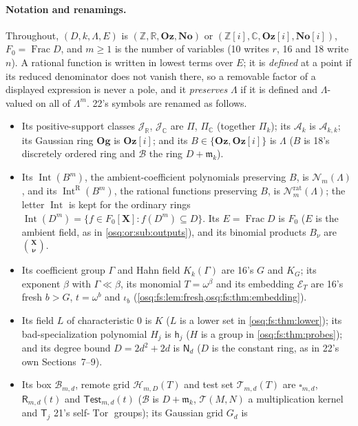 \documentclass[11pt,letterpaper]{article}
\numberwithin{equation}{section}
\theoremstyle{definition}
\theoremstyle{remark}
\theoremstyle{plain}
\newcommand{\No}{\mathbf{No}}
\newcommand{\Oz}{\mathbf{Oz}}
\newcommand{\SC}{\No[i]}
\newcommand{\GOz}{\Oz[i]}
\newcommand{\Z}{\mathbb Z}
\newcommand{\R}{\mathbb R}
\newcommand{\C}{\mathbb C}
\newcommand{\A}{\mathcal A}          %
\newcommand{\B}{\mathcal B}          %
\newcommand{\mm}{\mathfrak m}        %
\newcommand{\Frac}{\operatorname{Frac}}
\newcommand{\Tor}{\operatorname{Tor}}
\newcommand{\Int}{\operatorname{Int}}
\newcommand{\Num}{\mathscr N}
\begin{document}
\paragraph{Notation and renamings.} Throughout, $(D,k,\Lambda,E)$ is $(\Z,\R,\Oz,\No)$ or $(\Z[i],\C,\GOz,\SC)$, $F_0=\Frac D$, and $m\ge1$ is the
number of variables (10 writes $r$, 16 and 18 write $n$). A rational function is written in lowest terms over $E$; it is \emph{defined} at a point if its
reduced denominator does not vanish there, so a removable factor of a displayed expression is never a pole, and it \emph{preserves} $\Lambda$ if it is
defined and $\Lambda$-valued on all of $\Lambda^m$. 22's symbols are renamed as follows.
\begin{itemize}
\item Its positive-support classes $\mathcal J_\R$, $\mathcal J_\C$ are $\Pi$, $\Pi_\C$ (together $\Pi_k$); its $\mathcal A_k$ is $\A_{k,k}$; its Gaussian
ring $\mathbf{Og}$ is $\GOz$; and its $B\in\{\Oz,\GOz\}$ is $\Lambda$ ($B$ is 18's discretely ordered ring and $\B$ the ring $D+\mm_k$).
\item Its $\Int(B^m)$, the ambient-coefficient polynomials preserving $B$, is $\Num_m(\Lambda)$, and its $\operatorname{Int}^{\mathrm R}(B^m)$, the rational
functions preserving $B$, is $\Num^{\mathrm{rat}}_m(\Lambda)$; the letter $\Int$ is kept for the ordinary rings $\Int(D^m)=\{f\in F_0[\mathbf X]:f(D^m)\subseteq D\}$.
Its $E=\Frac D$ is $F_0$ ($E$ is the ambient field, as in \cref{osq:or:sub:outputs}), and its binomial products $B_\nu$ are $\binom{\mathbf X}{\boldsymbol\nu}$.
\item Its coefficient group $\Gamma$ and Hahn field $K_k(\Gamma)$ are 16's $G$ and $K_G$; its exponent $\beta$ with $\Gamma\ll\beta$, its monomial $T=\omega^\beta$
and its embedding $\mathcal E_T$ are 16's fresh $b>G$, $t=\omega^b$ and $\iota_b$ (\cref{osq:fs:lem:fresh,osq:fs:thm:embedding}).
\item Its field $L$ of characteristic $0$ is $K$ ($L$ is a lower set in \cref{osq:fs:thm:lower}); its bad-specialization polynomial $H_j$ is $\mathsf h_j$ ($H$ is
a group in \cref{osq:fs:thm:probes}); and its degree bound $D=2d^2+2d$ is $\mathsf N_d$ ($D$ is the constant ring, as in 22's own Sections~7--9).
\item Its box $\mathcal B_{m,d}$, remote grid $\mathcal H_{m,D}(T)$ and test set $\mathcal T_{m,d}(T)$ are $\square_{m,d}$, $\mathsf R_{m,d}(t)$ and
$\mathsf{Test}_{m,d}(t)$ ($\B$ is $D+\mm_k$, $\mathcal T(M,N)$ a multiplication kernel and $\mathsf T_j$ 21's self-$\Tor$ groups); its Gaussian grid $G_d$ is

\end{itemize}
\end{document}
